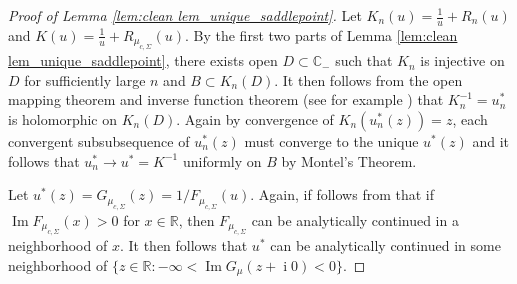 \documentclass[reqno]{amsart}
\newcommand{\1}{\mathbf{1}}
\DeclareMathOperator{\ii}{i}
\newcommand{\C}{\mathbb{C}}
\renewcommand\Im{\operatorname{Im}}
\newcommand{\eps}{\varepsilon}
\newcommand{\R}{\mathbb{R}}
\def\R{\mathbb{R}}
\theoremstyle{plain}
\theoremstyle{definition}
\theoremstyle{remark}
\numberwithin{equation}{section}
\begin{document}
\begin{proof}[Proof of Lemma \ref{lem:clean lem_unique_saddlepoint}]
	Let $K_n(u)=\frac{1}{u}+R_n(u)$ and $K(u)=\frac{1}{u}+R_{\mu_{c,\Sigma}}(u)$. By the first two parts of Lemma \ref{lem:clean lem_unique_saddlepoint}, there exists open $D\subset\C_-$  such that $K_n$ is injective on $D$ for sufficiently large $n$ and $B\subset K_n(D)$. It then follows from the open mapping theorem and inverse function theorem (see for example \cite[\S 8.1, Proposition 1.1]{Stein--Shakarchi2003}) that $K_n^{-1}=u_n^{*}$ is holomorphic on $K_n(D)$. Again by convergence of $K_n(u_n^*(z))=z$, each convergent subsubsequence of $u_n^*(z)$ must converge to the unique $u^*(z)$ and it follows that $u_n^*\to u^*=K^{-1}$ uniformly on $B$ by Montel's Theorem. 
	
	Let $u^*(z)=G_{\mu_{c,\Sigma}}(z)=1/F_{\mu_{c,\Sigma}}(u)$. Again, if follows from \cite[Theorem 4.6]{Belinschi-Bercovici2005} that if  $\Im F_{\mu_{c,\Sigma}}(x)>0$ for $x\in\R$, then $F_{\mu_{c,\Sigma}}$ can be analytically continued in a neighborhood of $x$. It then follows that $u^*$ can be analytically continued in some neighborhood of $\{z\in\R: -\infty<\Im G_{\mu}(z+\ii0)<0\}$. 
\end{proof}
	
%	
\end{document}
